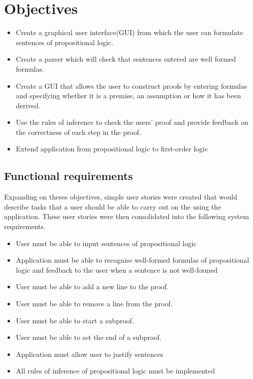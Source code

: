 \section{Objectives}
\begin{itemize}
\item{Create a graphical user interface(GUI) from which the user can formulate sentences of propositional logic.}
\item{Create a parser which will check that sentences entered are well formed formulas.}
\item{Create a GUI that allows the user to construct proofs by entering formulas and specifying whether it is a premise, an assumption or how it has been derived.}
\item{Use the rules of inference to check the users' proof and provide feedback on the correctness of each step in the proof.}

\item{Extend application from propositional logic to first-order logic}
\end{itemize}

\subsection{Functional requirements}

Expanding on theses objectives, simple user stories were created that would describe tasks that a user should be able to carry out on the using the application. These user stories were then consolidated into the following system requirements.

\begin{itemize}

\item{User must be able to input sentences of propositional logic}

\item{Application must be able to recognise well-formed formulas of propositional logic and feedback to the user when a sentence is not well-formed}

\item{User must be able to add a new line to the proof.}
\item{User must be able to remove a line from the proof.}
\item{User must be able to start a subproof.}
\item{User must be able to set the end of a subproof.}
\item{Application must allow user to justify sentences}
\item{All rules of inference of propositional logic must be implemented}
\end{itemize}

